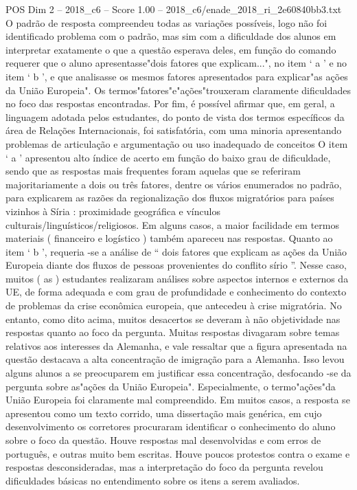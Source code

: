 \begin{textsample}{POS Dim 2 – 2018\_c6 – Score 1.00 – 2018\_c6/enade\_2018\_ri\_2e60840bb3.txt}
O padrão de resposta compreendeu todas as variações possíveis, logo não foi identificado problema com o padrão, mas sim com a dificuldade dos alunos em interpretar exatamente o que a questão esperava deles, em função do comando requerer que o aluno apresentasse"dois fatores que explicam...", no item ‘ a ’ e no item ‘ b ’, e que analisasse os mesmos fatores apresentados para explicar"as ações da União Europeia".
Os termos"fatores"e"ações"trouxeram claramente dificuldades no foco das respostas encontradas.
Por fim, é possível afirmar que, em geral, a linguagem adotada pelos estudantes, do ponto de vista dos termos específicos da área de Relações Internacionais, foi satisfatória, com uma minoria apresentando problemas de articulação e argumentação ou uso inadequado de conceitos O item ‘ a ’ apresentou alto índice de acerto em função do baixo grau de dificuldade, sendo que as respostas mais frequentes foram aquelas que se referiram majoritariamente a dois ou três fatores, dentre os vários enumerados no padrão, para explicarem as razões da regionalização dos fluxos migratórios para países vizinhos à Síria : proximidade geográfica e vínculos culturais/linguísticos/religiosos.
Em alguns casos, a maior facilidade em termos materiais ( financeiro e logístico ) também apareceu nas respostas.
Quanto ao item ‘ b ’, requeria -se a análise de “ dois fatores que explicam as ações da União Europeia diante dos fluxos de pessoas provenientes do conflito sírio ”.
Nesse caso, muitos ( as ) estudantes realizaram análises sobre aspectos internos e externos da UE, de forma adequada e com grau de profundidade e conhecimento do contexto de problemas da crise econômica europeia, que antecedeu à crise migratória.
No entanto, como dito acima, muitos desacertos se deveram à não objetividade nas respostas quanto ao foco da pergunta.
Muitas respostas divagaram sobre temas relativos aos interesses da Alemanha, e vale ressaltar que a figura apresentada na questão destacava a alta concentração de imigração para a Alemanha.
Isso levou alguns alunos a se preocuparem em justificar essa concentração, desfocando -se da pergunta sobre as"ações da União Europeia".
Especialmente, o termo"ações"da União Europeia foi claramente mal compreendido.
Em muitos casos, a resposta se apresentou como um texto corrido, uma dissertação mais genérica, em cujo desenvolvimento os corretores procuraram identificar o conhecimento do aluno sobre o foco da questão.
Houve respostas mal desenvolvidas e com erros de português, e outras muito bem escritas.
Houve poucos protestos contra o exame e respostas desconsideradas, mas a interpretação do foco da pergunta revelou dificuldades básicas no entendimento sobre os itens a serem avaliados.

\end{textsample}
